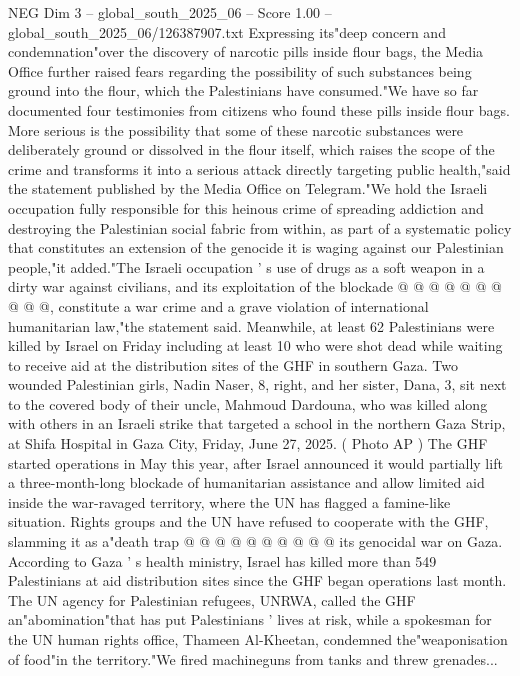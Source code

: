 \begin{textsample}{NEG Dim 3 – global\_south\_2025\_06 – Score 1.00 – global\_south\_2025\_06/126387907.txt}  \label{ex:f3_neg_260}
Expressing its"deep concern and condemnation"over the discovery of narcotic pills inside flour bags, the Media Office further raised fears regarding the possibility of such substances being ground into the flour, which the Palestinians have consumed."We have so far documented four testimonies from citizens who found these pills inside flour bags.
More serious is the possibility that some of these narcotic substances were deliberately ground or dissolved in the flour itself, which raises the scope of the crime and transforms it into a serious attack directly targeting public health,"said the statement published by the Media Office on Telegram."We hold the Israeli occupation fully responsible for this heinous crime of spreading addiction and destroying the Palestinian social fabric from within, as part of a systematic policy that constitutes an extension of the genocide it is waging against our Palestinian people,"it added."The Israeli occupation ' s use of drugs as a soft weapon in a dirty war against civilians, and its exploitation of the blockade @ @ @ @ @ @ @ @ @ @, constitute a war crime and a grave violation of international humanitarian law,"the statement said.
Meanwhile, at least 62 Palestinians were killed by Israel on Friday including at least 10 who were shot dead while waiting to receive aid at the distribution sites of the GHF in southern Gaza.
Two wounded Palestinian girls, Nadin Naser, 8, right, and her sister, Dana, 3, sit next to the covered body of their uncle, Mahmoud Dardouna, who was killed along with others in an Israeli strike that targeted a school in the northern Gaza Strip, at Shifa Hospital in Gaza City, Friday, June 27, 2025. ( Photo AP ) The GHF started operations in May this year, after Israel announced it would partially lift a three-month-long blockade of humanitarian assistance and allow limited aid inside the war-ravaged territory, where the UN has flagged a famine-like situation.
Rights groups and the UN have refused to cooperate with the GHF, slamming it as a"death trap @ @ @ @ @ @ @ @ @ @ its genocidal war on Gaza.
According to Gaza ' s health ministry, Israel has killed more than 549 Palestinians at aid distribution sites since the GHF began operations last month.
The UN agency for Palestinian refugees, UNRWA, called the GHF an"abomination"that has put Palestinians ' lives at risk, while a spokesman for the UN human rights office, Thameen Al-Kheetan, condemned the"weaponisation of food"in the territory."We fired machineguns from tanks and threw grenades...

\end{textsample}
